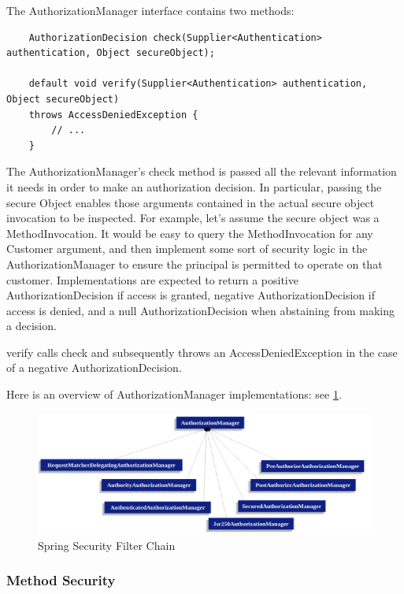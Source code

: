 \documentclass{scrartcl}
\begin{document}
The AuthorizationManager interface contains two methods:

\begin{lstlisting}
    AuthorizationDecision check(Supplier<Authentication> authentication, Object secureObject);

    default void verify(Supplier<Authentication> authentication, Object secureObject)
    throws AccessDeniedException {
        // ...
    }
\end{lstlisting}

The AuthorizationManager's check method is passed all the relevant information it needs in order to make an authorization decision. In particular, passing the secure Object enables those arguments contained in the actual secure object invocation to be inspected. For example, let’s assume the secure object was a MethodInvocation. It would be easy to query the MethodInvocation for any Customer argument, and then implement some sort of security logic in the AuthorizationManager to ensure the principal is permitted to operate on that customer. Implementations are expected to return a positive AuthorizationDecision if access is granted, negative AuthorizationDecision if access is denied, and a null AuthorizationDecision when abstaining from making a decision.

verify calls check and subsequently throws an AccessDeniedException in the case of a negative AuthorizationDecision.

Here is an overview of AuthorizationManager implementations: see \ref{fig:auth-manag-impl}.

\begin{figure}
    \centering
    \includegraphics[width=1\linewidth]{auth-manag-impl}
    \caption{Spring Security Filter Chain}
    \label{fig:auth-manag-impl}
\end{figure}

\subsubsection{Method Security}
\end{document}

